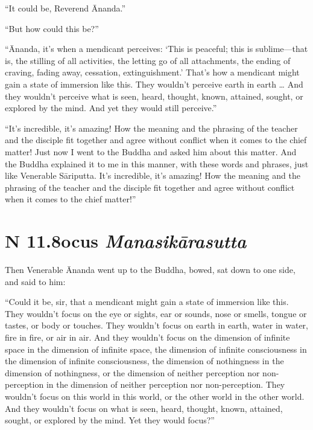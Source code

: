 \documentclass[12pt,openany]{book}%
\newcommand*{\suttatitleacronym}[1]{\smaller[2]{#1}\vspace*{.3em}}
\newcommand*{\suttatitletranslation}[1]{\linebreak{#1}}
\newcommand*{\suttatitleroot}[1]{\linebreak\smaller[2]\itshape{#1}}
\newcommand*{\tocacronym}[1]{\hspace*{-3.3em}{#1}\quad}
\newcommand*{\toctranslation}[1]{#1}
\newcommand*{\tocroot}[1]{(\textit{#1})}
\begin{document}
“It could be, Reverend Ānanda.” 

“But how could this be?” 

“Ānanda, it’s when a mendicant perceives: ‘This is peaceful; this is sublime—that is, the stilling of all activities, the letting go of all attachments, the ending of craving, fading away, cessation, extinguishment.’ That’s how a mendicant might gain a state of immersion like this. They wouldn’t perceive earth in earth … And they wouldn’t perceive what is seen, heard, thought, known, attained, sought, or explored by the mind. And yet they would still perceive.” 

“It’s incredible, it’s amazing! How the meaning and the phrasing of the teacher and the disciple fit together and agree without conflict when it comes to the chief matter! Just now I went to the Buddha and asked him about this matter. And the Buddha explained it to me in this manner, with these words and phrases, just like Venerable \textsanskrit{Sāriputta}. It’s incredible, it’s amazing! How the meaning and the phrasing of the teacher and the disciple fit together and agree without conflict when it comes to the chief matter!” 

%
\section*{{\suttatitleacronym AN 11.8}{\suttatitletranslation Focus }{\suttatitleroot Manasikārasutta}}
\addcontentsline{toc}{section}{\tocacronym{AN 11.8} \toctranslation{Focus } \tocroot{Manasikārasutta}}

Then Venerable Ānanda went up to the Buddha, bowed, sat down to one side, and said to him: 

“Could it be, sir, that a mendicant might gain a state of immersion like this. They wouldn’t focus on the eye or sights, ear or sounds, nose or smells, tongue or tastes, or body or touches. They wouldn’t focus on earth in earth, water in water, fire in fire, or air in air. And they wouldn’t focus on the dimension of infinite space in the dimension of infinite space, the dimension of infinite consciousness in the dimension of infinite consciousness, the dimension of nothingness in the dimension of nothingness, or the dimension of neither perception nor non-perception in the dimension of neither perception nor non-perception. They wouldn’t focus on this world in this world, or the other world in the other world. And they wouldn’t focus on what is seen, heard, thought, known, attained, sought, or explored by the mind. Yet they would focus?” 
\end{document}
